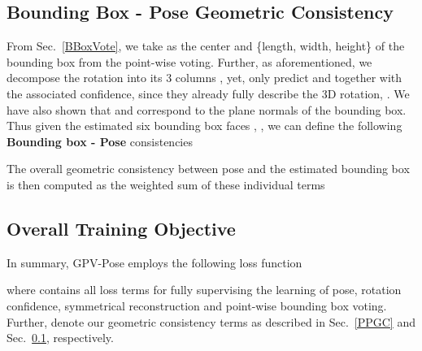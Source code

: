 \documentclass[10pt,twocolumn,letterpaper]{article}
\begin{document}
\subsection{Bounding Box - Pose Geometric Consistency}
\label{BPGC}
From Sec.~\ref{BBoxVote}, we take  as the center and \{length, width, height\} of the bounding box from the point-wise voting.
Further, as aforementioned, we decompose the rotation  into its 3 columns , yet, only predict  and  together with the associated confidence, since they already fully describe the 3D rotation, \ie .
We have also shown that  and  correspond to the plane normals of the bounding box.
Thus given the estimated six bounding box faces , , we can define the following \textbf{Bounding box - Pose} consistencies
 

The overall geometric consistency between pose and the estimated bounding box is then computed as the weighted sum of these individual terms



\subsection{Overall Training Objective}
In summary, GPV-Pose employs the following loss function

where  contains all loss terms for fully supervising the learning of pose, rotation confidence, symmetrical reconstruction and point-wise bounding box voting.
Further,  denote our geometric consistency terms as described in Sec.~\ref{PPGC} and Sec.~\ref{BPGC}, respectively.
\end{document}

